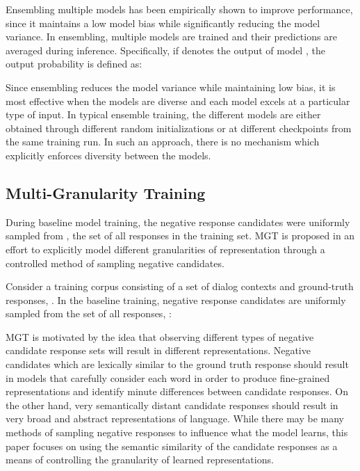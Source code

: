 \documentclass[11pt,a4paper]{article}
\begin{document}
Ensembling multiple models \citep{perrone1992networks} has been empirically shown to improve performance, since it maintains a low model bias while significantly reducing the model variance. In ensembling, multiple models are trained and their predictions are averaged during inference. Specifically, if  denotes the output of model , the output probability is defined as:



Since ensembling reduces the model variance while maintaining low bias, it is most effective when the models are diverse and each model excels at a particular type of input. In typical ensemble training, the different models are either obtained through different random initializations or at different checkpoints from the same training run. In such an approach, there is no mechanism which explicitly enforces diversity between the models.

\subsection{Multi-Granularity Training}

During baseline model training, the negative response candidates were uniformly sampled from , the set of all responses in the training set. MGT is proposed in an effort to explicitly model different granularities of representation through a controlled method of sampling negative candidates. 

Consider a training corpus consisting of a set of dialog contexts and ground-truth responses, . In the baseline training,  negative response candidates are uniformly sampled from the set of all responses, :



MGT is motivated by the idea that observing different types of negative candidate response sets will result in different representations. Negative candidates which are lexically similar to the ground truth response should result in models that carefully consider each word in order to produce fine-grained representations and identify minute differences between candidate responses. On the other hand, very semantically distant candidate responses should result in very broad and abstract representations of language. While there may be many methods of sampling negative responses to influence what the model learns, this paper focuses on using the semantic similarity of the candidate responses as a means of controlling the granularity of learned representations. 
\end{document}
